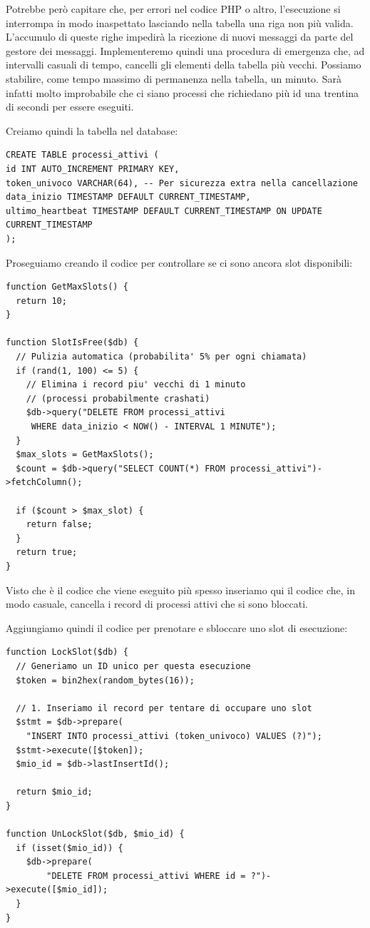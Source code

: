 Potrebbe per\`o capitare che, per errori nel codice PHP o altro, l'esecuzione si interrompa in modo inaspettato lasciando nella tabella una riga non pi\`u valida. L'accumulo di queste righe impedir\`a la ricezione di nuovi messaggi da parte del gestore dei messaggi. Implementeremo quindi una procedura di emergenza che, ad intervalli casuali di tempo, cancelli gli elementi della tabella pi\`u vecchi. Possiamo stabilire, come tempo massimo di permanenza nella tabella, un minuto. Sar\`a infatti molto improbabile che ci siano processi che richiedano pi\`u id una trentina di secondi per essere eseguiti. 

Creiamo quindi la tabella nel database:

\begin{verbatim}
CREATE TABLE processi_attivi (
id INT AUTO_INCREMENT PRIMARY KEY,
token_univoco VARCHAR(64), -- Per sicurezza extra nella cancellazione
data_inizio TIMESTAMP DEFAULT CURRENT_TIMESTAMP,
ultimo_heartbeat TIMESTAMP DEFAULT CURRENT_TIMESTAMP ON UPDATE CURRENT_TIMESTAMP
);
\end{verbatim}

Proseguiamo creando il codice per controllare se ci sono ancora slot disponibili:

\begin{verbatim}
function GetMaxSlots() {
  return 10;
}   
    
function SlotIsFree($db) {
  // Pulizia automatica (probabilita' 5% per ogni chiamata)
  if (rand(1, 100) <= 5) {
    // Elimina i record piu' vecchi di 1 minuto 
    // (processi probabilmente crashati)
    $db->query("DELETE FROM processi_attivi
     WHERE data_inizio < NOW() - INTERVAL 1 MINUTE");
  }
  $max_slots = GetMaxSlots();
  $count = $db->query("SELECT COUNT(*) FROM processi_attivi")->fetchColumn();
  
  if ($count > $max_slot) {
    return false;
  }
  return true;
}
\end{verbatim}

Visto che \`e il codice che viene eseguito pi\`u spesso inseriamo qui il codice che, in modo casuale, cancella i record di processi attivi che si sono bloccati.

Aggiungiamo quindi il codice per prenotare e sbloccare uno slot di esecuzione:

\begin{verbatim}
function LockSlot($db) {
  // Generiamo un ID unico per questa esecuzione
  $token = bin2hex(random_bytes(16)); 

  // 1. Inseriamo il record per tentare di occupare uno slot
  $stmt = $db->prepare(
  	"INSERT INTO processi_attivi (token_univoco) VALUES (?)");
  $stmt->execute([$token]);
  $mio_id = $db->lastInsertId();
  
  return $mio_id;   
}   

function UnLockSlot($db, $mio_id) {
  if (isset($mio_id)) {
    $db->prepare(
    	"DELETE FROM processi_attivi WHERE id = ?")->execute([$mio_id]);
  }
}   

\end{verbatim}

